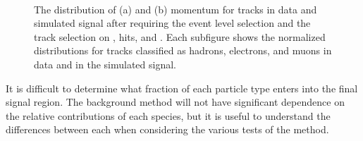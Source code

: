 \begin{figure}[h]
\centering
{}
\\
\caption{The distribution of (a) \dedx and (b) momentum for tracks in data and simulated signal after requiring the event level selection and the track selection on \pt, hits, and \Nsplit. Each subfigure shows the normalized distributions for tracks classified as hadrons, electrons, and muons in data and \rhadrons in the simulated signal.}
\label{fig:background_species}
\end{figure}

It is difficult to determine what fraction of each particle type enters into the final signal region.
The background method will not have significant dependence on the relative contributions of each species, but it is useful to understand the differences between each when considering the various tests of the method.

